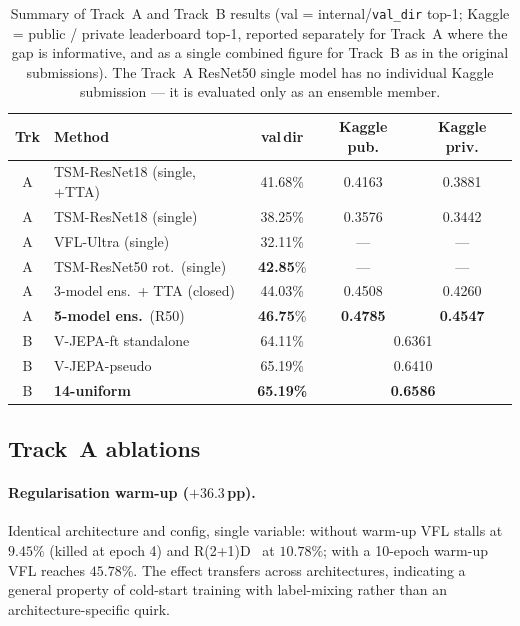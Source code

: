 \documentclass[10pt,twocolumn,letterpaper]{article}
\begin{document}
\begin{table}[t]
\centering\small
\setlength{\tabcolsep}{3.4pt}
\begin{tabular}{@{}clccc@{}}
\toprule
Trk & Method & val\,dir & Kaggle pub. & Kaggle priv. \\
\midrule
A & TSM-ResNet18 (single, +TTA) & 41.68\% & 0.4163 & 0.3881 \\
A & TSM-ResNet18 (single)       & 38.25\% & 0.3576 & 0.3442 \\
A & VFL-Ultra (single)          & 32.11\% & ---    & --- \\
A & TSM-ResNet50 rot.\ (single) & \textbf{42.85}\% & --- & --- \\
A & 3-model ens.\ + TTA (closed)& 44.03\% & 0.4508 & 0.4260 \\
A & \textbf{5-model ens.}\ (R50)& \textbf{46.75}\% & \textbf{0.4785} & \textbf{0.4547} \\
\midrule
B & V-JEPA-ft standalone        & 64.11\% & \multicolumn{2}{c}{0.6361} \\
B & V-JEPA-pseudo               & 65.19\% & \multicolumn{2}{c}{0.6410} \\
B & \textbf{14-uniform}         & \textbf{65.19\%} & \multicolumn{2}{c}{\textbf{0.6586}} \\
\bottomrule
\end{tabular}
\caption{Summary of Track~A and Track~B results (val = internal/\texttt{val\_dir}
top-1; Kaggle = public / private leaderboard top-1, reported separately for
Track~A where the gap is informative, and as a single combined figure for
Track~B as in the original submissions). The Track~A ResNet50 single model has
no individual Kaggle submission --- it is evaluated only as an ensemble member.}
\label{tab:summary}
\end{table}

\subsection{Track~A ablations}
\label{sec:abl}
\paragraph{Regularisation warm-up ($+36.3$\,pp).}
Identical architecture and config, single variable: without warm-up VFL stalls
at $9.45\%$ (killed at epoch 4) and R(2+1)D~\cite{tran2018r2plus1d} at $10.78\%$;
with a 10-epoch warm-up VFL reaches $45.78\%$. The effect transfers across
architectures, indicating a general property of cold-start training with
label-mixing rather than an architecture-specific quirk.
\end{document}
